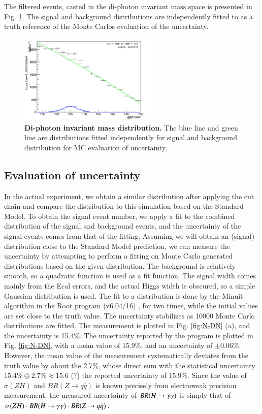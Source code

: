 \documentclass[11pt,a4paper]{cepcnote}
\newcommand{\Zqq}{Z\rightarrow q\bar q}
\newcommand{\PRZH}{\sigma(ZH)}
\newcommand{\qt}{\PRZH\cdot BR(\Hgg)\cdot BR(\Zqq)}
\begin{document}
The filtered events, casted in the di-photon invariant mass space is presented in Fig. \ref{fig:ggM}. The signal and background distributions are independently fitted to as a truth reference of the Monte Carlos evaluation of the uncertainty.

\begin{figure}[h]
	\includegraphics[width=0.6\textwidth]{ggM.png}
	\centering
	\caption{\textbf{Di-photon invariant mass distribution.} The blue line and green line are distributions fitted independently for signal and background distribution for MC evaluation of uncertainty.}
	\label{fig:ggM}
\end{figure}

\subsection{Evaluation of uncertainty}
In the actual experiment, we obtain a similar distribution after applying the cut chain and compare the distribution to this simulation based on the Standard Model. To obtain the signal event number, we apply a fit to the combined distribution of the signal and background events, and the uncertainty of the signal events comes from that of the fitting. Assuming we will obtain an (signal) distribution close to the Standard Model prediction, we can measure the uncertainty by attempting to perform a fitting on Monte Carlo generated distributions based on the given distribution. The background is relatively smooth, so a quadratic function is used as a fit function. The signal width comes mainly from the Ecal errors, and the actual Higgs width is obscured, so a simple Gaussian distribution is used. The fit to a distribution is done by the Minuit algorithm in the Root program (v6.04/16) \cite{root,minuit}, for two times, while the initial values are set close to the truth value. The uncertainty stabilizes as 10000 Monte Carlo distributions are fitted. The measurement is plotted in Fig. \ref{fig:N-DN} (a), and the uncertainty is 15.4\%. The uncertainty reported by the program is plotted in Fig. \ref{fig:N-DN}, with a mean value of 15.9\%, and an uncertainty of $\pm 0.06\%$. However, the mean value of the measurement systematically deviates from the truth value by about the 2.7\%, whose direct sum with the statistical uncertainty $15.4\%\oplus2.7\%\approx15.6$ (?) the reported uncertainty of $15.9\%$. Since the value of $\PRZH$ and $BR(\Zqq)$ is known precisely from electroweak precision measurement, the measured uncertainty of $BR(H\rightarrow\gamma\gamma)$ is simply that of $\qt$.
\end{document}
